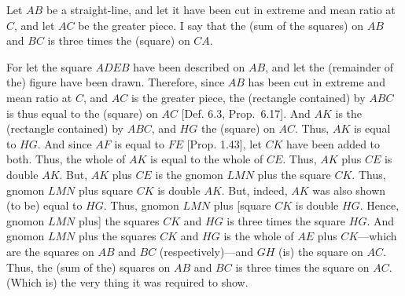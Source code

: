 \begin{Parallel}{}{}
{Let $AB$ be a straight-line, and let it have been cut in extreme and mean
ratio at $C$, and let $AC$ be the greater piece. I say that the (sum of the
squares) on $AB$ and $BC$ is three times the (square) on $CA$.

For let the square $ADEB$ have been described on $AB$, and
let the (remainder of the) figure have been drawn. Therefore, since
$AB$ has been cut in extreme and mean ratio at $C$,  and $AC$ is the greater piece, the (rectangle contained) by $ABC$ is thus equal to the
(square) on $AC$ [Def. 6.3, Prop.~6.17]. And $AK$ is the (rectangle
contained) by $ABC$, and $HG$ the (square) on $AC$. Thus,
$AK$ is equal to $HG$.  And since $AF$ is equal to $FE$ [Prop. 1.43],
let $CK$ have been added to both. Thus, the whole of $AK$  is equal to
the whole of $CE$. Thus, $AK$ plus $CE$ is double $AK$. But, $AK$
plus $CE$ is the gnomon $LMN$ plus the square $CK$. Thus, 
gnomon $LMN$ plus square $CK$ is double $AK$. But, indeed,
$AK$ was also shown (to be) equal to $HG$. Thus, gnomon $LMN$
plus [square $CK$ is double $HG$. Hence, gnomon $LMN$ plus] the
 squares $CK$ and $HG$ is three times the square $HG$.
And  gnomon $LMN$ plus the  squares  $CK$ and
$HG$ is the whole of $AE$ plus $CK$---which are the 
squares on $AB$ and $BC$ (respectively)---and $GH$ (is) the square on $AC$. 
Thus, the (sum of the) squares on $AB$ and $BC$ is three times the
square on $AC$. (Which is) the very thing it was required to show.}
\end{Parallel}

